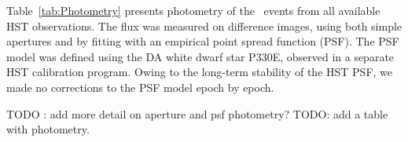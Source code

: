Table~\ref{tab:Photometry} presents photometry of the \spock\ events from all available HST observations. The flux was measured on difference images, using both simple apertures and by fitting with an empirical point spread function (PSF).  The PSF model was defined using the DA white dwarf star P330E, observed in a separate HST calibration program. Owing to the long-term stability of the HST PSF, we made no corrections to the PSF model epoch by epoch. 

TODO : add more detail on aperture and psf photometry?
TODO: add a table with photometry.


  
  

  
  
  
  
  
  
  
  